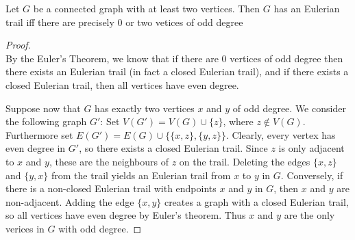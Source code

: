 \begin{theorem}\label{1.17}
    Let $G$ be a connected graph with at least two vertices. Then $G$ has an Eulerian trail iff there are precisely $0$ or two vetices of odd degree
\end{theorem}
\begin{proof}
    \hfill\\
    By the Euler's Theorem, we know that if there are $0$ vertices of odd degree then there exists an Eulerian trail (in fact a closed Eulerian trail), and if there exists a closed Eulerian trail, then all vertices have even degree.\par
    Suppose now that $G$ has exactly two vertices $x$ and $y$ of odd degree. We consider the following graph $G'$: Set $V(G')=V(G)\cup \{z\}$, where $z\notin V(G)$. Furthermore set $E(G')=E(G)\cup\{\{x,z\},\{y,z\}\}$. Clearly, every vertex has even degree in $G'$, so there exists a closed Eulerian trail. Since $z$ is only adjacent to $x$ and $y$, these are the neighbours of $z$ on the trail. Deleting the edges $\{x,z\}$ and $\{y,x\}$ from the trail yields an Eulerian trail from $x$ to $y$ in $G$. Conversely, if there is a non-closed Eulerian trail with endpoints $x$ and $y$ in $G$, then $x$ and $y$ are non-adjacent. Adding the edge $\{x,y\}$ creates a graph with a closed Eulerian trail, so all vertices have even degree by Euler's theorem. Thus $x$ and $y$ are the only verices in $G$ with odd degree.
\end{proof}
